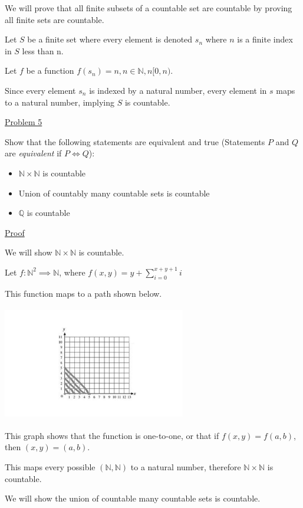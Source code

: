 \documentclass{article}
\begin{document}
We will prove that all finite subsets of a countable set are countable by proving all finite sets are countable.

Let $S$ be a finite set where every element is denoted $s_n$ where $n$ is a finite index in $S$ less than n.

Let $f$ be a function $f(s_n)=n, n\in \mathbb{N}, n[0,n)$.

Since every element $s_n$ is indexed by a natural number, every element in $s$ maps to a natural number, implying $S$ is countable.

\underline{Problem 5}

Show that the following statements are equivalent and true (Statements $P$ and $Q$ are \textit{equivalent} if $P \iff Q$):
\begin{itemize}
\item $\mathbb{N}\times\mathbb{N}$ is countable
\item Union of countably many countable sets is countable
\item $\mathbb{Q}$ is countable
\end{itemize}

\underline{Proof}

We will show $\mathbb{N}\times\mathbb{N}$ is countable.

Let $f: \mathbb{N}^2 \implies \mathbb{N}$, where $f(x,y) = y + \sum_{i=0}^{x + y + 1}i$

This function maps to a path shown below.

\includegraphics[width=8cm, height=5cm]{q5graph}

This graph shows that the function is one-to-one, or that if $f(x,y)=f(a,b)$, then $(x,y)=(a,b)$.

This maps every possible $(\mathbb{N},\mathbb{N})$ to a natural number, therefore $\mathbb{N}\times\mathbb{N}$ is countable.

\bigskip

We will show the union of countable many countable sets is countable.
\end{document}
